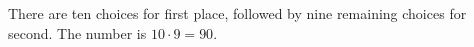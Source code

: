 There are ten choices for first place, followed by nine remaining choices for second. The number is $\boxed{10\cdot9=90}$.
